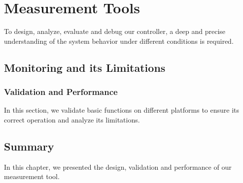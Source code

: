 \chapter{Measurement Tools}
\label{sec:mmeasurement}

To design, analyze, evaluate and debug  our controller,  a deep and precise understanding of the system behavior under different conditions is required.
%

\section{Monitoring and its Limitations}
\label{sec:measurement:current}

%



\subsection{Validation and Performance}
\label{sec:measurementg:validation}

In this section, we validate basic functions on different platforms to ensure its correct operation and analyze its limitations.
%


\section{Summary}

In this chapter, we presented the design, validation and performance of our measurement tool.
%